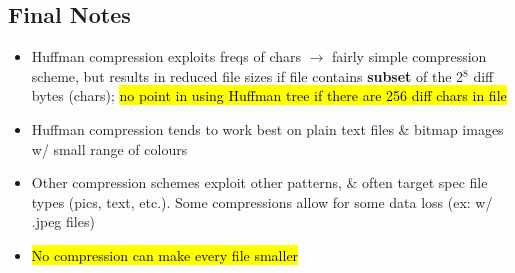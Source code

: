 \documentclass{article}
\begin{document}
\begin{multicols}{2}
\subsection{Final Notes}
    \begin{itemize}
        \item Huffman compression exploits freqs of chars $\rightarrow$ fairly simple compression scheme, but results in reduced file sizes if file contains \textbf{subset} of the 2$^8$ diff bytes (chars); \hl{no point in using Huffman tree if there are 256 diff chars in file}
        \item Huffman compression tends to work best on plain text files \& bitmap images w/ small range of colours
        \item Other compression schemes exploit other patterns, \& often target spec file types (pics, text, etc.). Some compressions allow for some data loss (ex: w/ .jpeg files)
        \item \hl{No compression can make every file smaller}
    \end{itemize}
\end{multicols}
\end{document}
